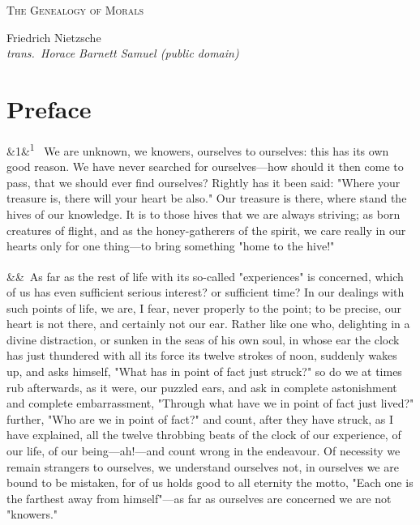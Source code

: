 \documentclass[12pt]{article}
\newcommand{\work}[1]{\begin{center}\LARGE\scshape #1\end{center}}
\newcommand{\attrib}[2]{\begin{center}\large #1\\[2pt]\small\itshape trans.\ #2\end{center}\vspace{1em}}
\newcommand{\para}[1][]{\par\noindent\ifx&#1&\else\textsuperscript{\footnotesize #1}~\fi}
\begin{document}
\work{The Genealogy of Morals}

\attrib{Friedrich Nietzsche}{Horace Barnett Samuel (public domain)}

\section*{Preface}

\para[1] We are unknown, we knowers, ourselves to ourselves: this has its own good reason. We have never searched for ourselves---how should it then come to pass, that we should ever find ourselves? Rightly has it been said: "Where your treasure is, there will your heart be also." Our treasure is there, where stand the hives of our knowledge. It is to those hives that we are always striving; as born creatures of flight, and as the honey-gatherers of the spirit, we care really in our hearts only for one thing---to bring something "home to the hive!"

\para As far as the rest of life with its so-called "experiences" is concerned, which of us has even sufficient serious interest? or sufficient time? In our dealings with such points of life, we are, I fear, never properly to the point; to be precise, our heart is not there, and certainly not our ear. Rather like one who, delighting in a divine distraction, or sunken in the seas of his own soul, in whose ear the clock has just thundered with all its force its twelve strokes of noon, suddenly wakes up, and asks himself, "What has in point of fact just struck?" so do we at times rub afterwards, as it were, our puzzled ears, and ask in complete astonishment and complete embarrassment, "Through what have we in point of fact just lived?" further, "Who are we in point of fact?" and count, after they have struck, as I have explained, all the twelve throbbing beats of the clock of our experience, of our life, of our being---ah!---and count wrong in the endeavour. Of necessity we remain strangers to ourselves, we understand ourselves not, in ourselves we are bound to be mistaken, for of us holds good to all eternity the motto, "Each one is the farthest away from himself"---as far as ourselves are concerned we are not "knowers."
\end{document}
